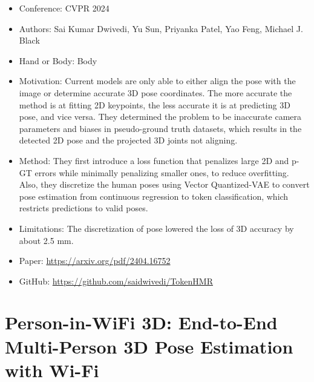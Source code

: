 \documentclass{article}
\begin{document}
\begin{itemize}
    \item Conference: CVPR 2024
    \item Authors: Sai Kumar Dwivedi, Yu Sun, Priyanka Patel, Yao Feng, Michael J. Black
    \item Hand or Body: Body
    \item Motivation: Current models are only able to either align the pose with the image or determine accurate 3D pose coordinates. The more accurate the method is at fitting 2D keypoints, the less accurate it is at predicting 3D pose, and vice versa. They determined the problem to be inaccurate camera parameters and biases in pseudo-ground truth datasets, which results in the detected 2D pose and the projected 3D joints not aligning.
    \item Method: They first introduce a loss function that penalizes large 2D and p-GT errors while minimally penalizing smaller ones, to reduce overfitting. Also, they discretize the human poses using Vector Quantized-VAE to convert pose estimation from continuous regression to token classification, which restricts predictions to valid poses.
    \item Limitations: The discretization of pose lowered the loss of 3D accuracy by about 2.5 mm.
    \item Paper: \url{https://arxiv.org/pdf/2404.16752}
    \item GitHub: \url{https://github.com/saidwivedi/TokenHMR}
\end{itemize}

\section*{Person-in-WiFi 3D: End-to-End Multi-Person 3D Pose Estimation with Wi-Fi}
\end{document}
